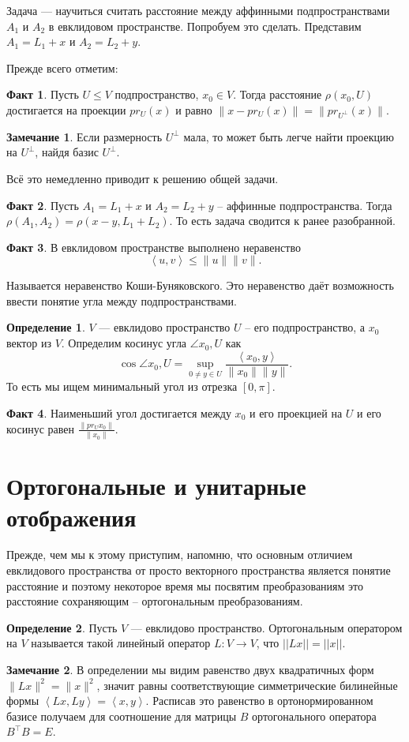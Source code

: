 \documentclass[10pt,a4paper,oneside]{book}
\theoremstyle{definition}
\newtheorem*{rem}{Замечание}
\newtheorem{defn}{Определение}
\newtheorem*{fact}{Факт}
\def\lan{\left\langle }
\def\ran{\right\rangle}
\def\dfn{\begin{defn}}
\def\edfn{\end{defn}}
\def\rm{\begin{rem}}
\def\erm{\end{rem}}
\def\fct{\begin{fact}}
\def\efct{\end{fact}}
\begin{document}
Задача --- научиться считать расстояние между аффинными подпространствами $A_1$ и $A_2$ в евклидовом пространстве. Попробуем это сделать. Представим $A_1=L_1+x$ и $A_2=L_2+y$. 

Прежде всего отметим:
\fct Пусть $U \leq V$ подпространство, $x_0 \in V$. Тогда расстояние $\rho(x_0,U)$ достигается на проекции  $pr_U(x)$ и равно $\|x-pr_U(x)\|=\|pr_{U^{\bot}}(x)\|$.
\efct

\rm Если размерность $U^{\bot}$ мала, то может быть легче найти проекцию на $U^{\bot}$, найдя базис $U^{\bot}$.
\erm

Всё это немедленно приводит к решению общей задачи.
\fct Пусть  $A_1=L_1+x$ и $A_2=L_2+y$ -- аффинные подпространства. Тогда $\rho(A_1,A_2)=\rho(x-y, L_1+L_2)$. То есть задача сводится к ранее разобранной.
\efct



\fct В евклидовом пространстве выполнено неравенство
$$ \lan u,v\ran \leq \|u\|\|v\|.$$
\efct
Называется неравенство Коши-Буняковского. Это неравенство даёт возможность ввести понятие угла между подпространствами.

\dfn $V$ --- евклидово пространство $U$ -- его подпространство, а $x_0$ вектор из $V$. Определим косинус угла $\angle x_0,U$ как 
$$\cos \angle x_0,U= \sup_{0\neq y\in U} \frac{\lan x_0,y\ran }{\|x_0\|\|y\|}.$$  
То есть мы ищем минимальный угол из отрезка $[0,\pi]$.
\edfn

\fct Наименьший угол достигается между $x_0$ и его проекцией на $U$ и его косинус равен $\frac{\|pr_{U}x_0\|}{\|x_0\|}$.  
\efct










\section{Ортогональные и унитарные отображения}

Прежде, чем мы к этому приступим, напомню, что основным отличием евклидового пространства от просто векторного пространства является понятие расстояние и поэтому некоторое время мы посвятим преобразованиям это расстояние сохраняющим -- ортогональным преобразованиям.

\dfn Пусть $V$ --- евклидово пространство. Ортогональным оператором на $V$ называется такой линейный оператор $L \colon V \to V$, что $||Lx||=
||x||$.
\edfn

\rm В определении мы видим равенство двух квадратичных форм $\|Lx\|^2=\|x\|^2$, значит равны соответствующие симметрические билинейные формы $\lan Lx,Ly\ran = \lan x,y\ran$.  Расписав это равенство в ортонормированном базисе получаем для соотношение для матрицы $B$ ортогонального оператора   $B^{\top} B=E$.
\erm
\end{document}
